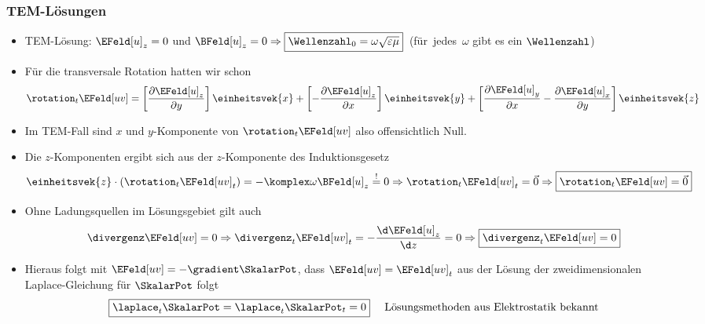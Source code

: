 \begin{frame}
\frametitle{TEM-Lösungen}
     \begin{itemize}[<+->]
     \item TEM-Lösung: \(\EFeld[u]_z = 0\) und \(\BFeld[u]_z=0 \Rightarrow \boxed{\Wellenzahl_0 = \omega \sqrt{\varepsilon\mu}}\)~(für~\alert{jedes}~\(\omega\) gibt es ein \(\Wellenzahl\)) 
    \item Für die transversale Rotation hatten wir schon
      \begin{equation*}
      \rotation_t \EFeld[uv] =  \left[ \frac{\partial \EFeld[u]_z}{\partial y} \right] \einheitsvek{x} + \left[ - \frac{\partial \EFeld[u]_{z}}{\partial x} \right] \einheitsvek{y } + \left[ \frac{\partial \EFeld[u]_{y}}{\partial x} - \frac{\partial \EFeld[u]_{x}}{\partial y}\right] \einheitsvek{z}
    \end{equation*}
  \item Im TEM-Fall sind \alert{\(x\) und \(y\)-Komponente} von \(\rotation_t \EFeld[uv]\) also \alert{offensichtlich Null}.
  \item Die \alert{\(z\)-Komponenten} ergibt sich aus der \(z\)-Komponente des Induktionsgesetz
     \begin{equation*}
        \einheitsvek{z} \cdot \left(\rotation_t \EFeld[uv]_t\right) = -\komplex\omega\BFeld[u]_z  \stackrel{!}{=} 0 \Rightarrow
        \rotation_t \EFeld[uv]_t = \vec{0} \Rightarrow \boxed{\rotation_t \EFeld[uv] = \vec{0}} 
      \end{equation*}
    \item Ohne Ladungsquellen im Lösungsgebiet gilt auch
      \begin{equation*}
     \divergenz\EFeld[uv] = 0 \Rightarrow \divergenz_t\EFeld[uv]_t = -\frac{\d \EFeld[u]_z}{\d z} = 0 \Rightarrow  \boxed{\divergenz_t\EFeld[uv]=0}
     \end{equation*}
    \item Hieraus folgt mit \(\EFeld[uv] = -\gradient\SkalarPot\), dass \(\EFeld[uv] = \EFeld[uv]_t\) aus der \alert{Lösung der zweidimensionalen Laplace-Gleichung} für \(\SkalarPot\) folgt
      \begin{equation*}
        \boxed{\laplace_t \SkalarPot = \laplace_t \SkalarPot_t = 0} \quad \text{ Lösungsmethoden aus Elektrostatik bekannt}
       \end{equation*}
     \end{itemize}
\end{frame}

